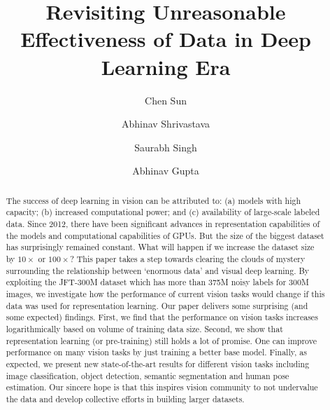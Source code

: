 \documentclass[10pt,twocolumn,letterpaper]{article}
\newcommand{\commentSS}[1]{{\color{blue}{SS: #1}}}
\begin{document}
\title{Revisiting Unreasonable Effectiveness of Data in Deep Learning Era}

\author[1]{Chen Sun}
\author[1,2]{Abhinav Shrivastava}
\author[1]{Saurabh Singh}
\author[1,2]{Abhinav Gupta}


\maketitle

\begin{abstract}
The success of deep learning in vision can be attributed to: (a) models with high capacity; (b) increased computational power; and (c) availability of large-scale labeled data. Since 2012, there have been significant advances in representation capabilities of the models and computational capabilities of GPUs. But the size of the biggest dataset has surprisingly remained constant.
What will happen if we increase the dataset size by $10\times$ or $100\times$? This paper takes a step towards clearing the clouds of mystery surrounding the relationship between `enormous data' and visual deep learning. 
By exploiting the JFT-300M dataset which has more than 375M noisy labels for 300M images, we investigate how the performance of current vision tasks would change if this data was used for representation learning.
Our paper delivers some surprising (and some expected) findings. First, we find that the performance on vision tasks increases logarithmically based on volume of training data size. Second, we show that representation learning (or pre-training) still holds a lot of promise. One can improve performance on many vision tasks by just training a better base model. Finally, as expected, we present new state-of-the-art results for different vision tasks including image classification, object detection, semantic segmentation and human pose estimation. Our sincere hope is that this inspires vision community to 
not undervalue the data and develop collective efforts in building larger datasets.

\vspace{-0.1in}
\end{abstract}
\end{document}

